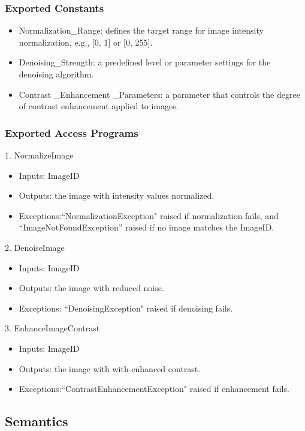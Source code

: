 \documentclass[12pt, titlepage]{article}
\begin{document}
\begin{itemize}
\subsubsection{Exported Constants}
\begin{itemize}
    \item Normalization\_Range: defines the target range for image intensity normalization, e.g., [0, 1] or [0, 255].
    \item Denoising\_Strength: a predefined level or parameter settings for the denoising algorithm.
    \item Contrast \_Enhancement \_Parameters: a parameter that controls the degree of contrast enhancement applied to images.
\end{itemize}

\subsubsection{Exported Access Programs}
1. NormalizeImage
\begin{itemize}
    \item Inputs: ImageID
    \item Outputs: the image with intensity values normalized.
    \item Exceptions:``NormalizationException" raised if normalization fails, and ``ImageNotFoundException” raised if no image matches the ImageID.
\end{itemize}

2. DenoiseImage
\begin{itemize}
    \item Inputs: ImageID
    \item Outputs: the image with reduced noise.
    \item Exceptions: ``DenoisingException" raised if denoising fails.
\end{itemize}

3. EnhanceImageContrast
\begin{itemize}
    \item Inputs: ImageID
    \item Outputs: the image with with enhanced contrast.
    \item Exceptions:``ContrastEnhancementException" raised if enhancement fails.
\end{itemize}


\subsection{Semantics}


\end{itemize}
\end{document}

